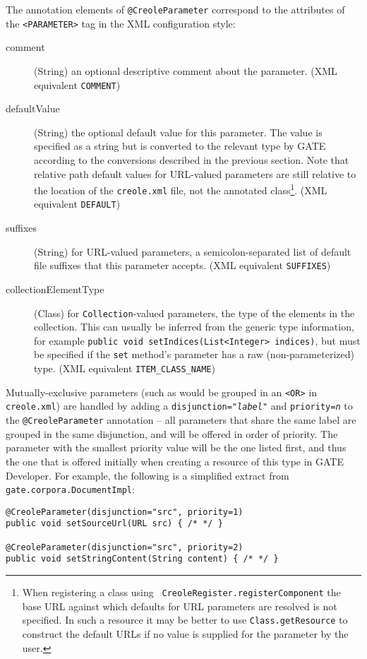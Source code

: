 The annotation elements of \verb|@CreoleParameter| correspond to the attributes
of the \verb|<PARAMETER>| tag in the XML configuration style:
\begin{description}
\item[comment] (String) an optional descriptive comment about the parameter.
  (XML equivalent \verb|COMMENT|)
\item[defaultValue] (String) the optional default value for this parameter.
  The value is specified as a string but is converted to the relevant type by
  GATE according to the conversions described in the previous section.  Note
  that relative path default values for URL-valued parameters are still
  relative to the location of the {\tt creole.xml} file, not the annotated
  class\footnote{When registering a class using {\tt
  CreoleRegister.registerComponent} the base URL against which defaults for URL
  parameters are resolved is not specified.  In such a resource it may be
  better to use {\tt Class.getResource} to construct the default URLs if no
  value is supplied for the parameter by the user.}.  (XML equivalent
  \verb|DEFAULT|)
\item[suffixes] (String) for URL-valued parameters, a semicolon-separated list
  of default file suffixes that this parameter accepts. (XML equivalent
  \verb|SUFFIXES|)
\item[collectionElementType] (Class) for {\tt Collection}-valued parameters,
  the type of the elements in the collection.  This can usually be inferred
  from the generic type information, for example
  \verb|public void setIndices(List<Integer> indices)|, but must be specified
  if the {\tt set} method's parameter has a raw (non-parameterized) type.
  (XML equivalent \verb|ITEM_CLASS_NAME|)
\end{description}

Mutually-exclusive parameters (such as would be grouped in an \verb|<OR>| in
{\tt creole.xml}) are handled by adding a {\tt disjunction="{\it label}"} and
{\tt priority={\it n}} to the \verb|@CreoleParameter| annotation -- all
parameters that share the same label are grouped in the same disjunction, and
will be offered in order of priority.  The parameter with the smallest priority
value will be the one listed first, and thus the one that is offered initially
when creating a resource of this type in GATE Developer.  For example, the
following is a simplified extract from {\tt gate.corpora.DocumentImpl}:

\begin{lstlisting}
@CreoleParameter(disjunction="src", priority=1)
public void setSourceUrl(URL src) { /* */ }

@CreoleParameter(disjunction="src", priority=2)
public void setStringContent(String content) { /* */ }
\end{lstlisting}

